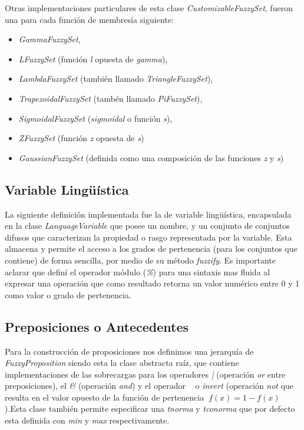 \documentclass[a4paper,10pt,twocolumn]{article}
\begin{document}
 
 Otras implementaciones particulares de esta clase \textit{CustomizableFuzzySet}, fueron una para cada funci\'on de membres\'ia siguiente:
 

 \begin{itemize}
 	\item \textit{GammaFuzzySet}, 
 	\item \textit{LFuzzySet} (funci\'on \textit{l} opuesta de \textit{gamma}), 
 	\item \textit{LambdaFuzzySet} (tambi\'en llamado \textit{TriangleFuzzySet}), 
 	\item \textit{TrapezoidalFuzzySet} (tamb\'en llamado \textit{PiFuzzySet}), 
 	\item \textit{SigmoidalFuzzySet} (\textit{sigmoidal} o funci\'on \textit{s}), 
 	\item \textit{ZFuzzySet} (funci\'on \textit{z} opuesta de \textit{s})
 	\item \textit{GaussianFuzzySet} (definida como una composici\'on de las funciones \textit{z} y \textit{s})
 \end{itemize}

\subsection*{Variable Lingüística}
 La siguiente definici\'on implementada fue la de variable lingüística, encapsulada en la clase \textit{LanguageVariable} que posee un nombre, y un conjunto de conjuntos difusos que caracterizan la propiedad o rasgo representada por la variable. Esta almacena y permite el acceso a los grados de pertenencia (para los conjuntos que contiene) de forma sencilla, por medio de su m\'etodo \textit{fuzzify}. Es importante aclarar que defin\'i el operador m\'odulo (\textit{\%}) para una sintaxis mas fluida al expresar una operaci\'on que como resultado retorna un valor num\'erico entre 0 y 1 como valor o grado de pertenencia.

 \subsection*{Preposiciones o Antecedentes}
 Para la construcci\'on de proposiciones nos definimos una jerarqu\'ia de \textit{FuzzyProposition} siendo esta la clase abstracta ra\'iz, que contiene implementaciones de las sobrecargas para los operadores \textit{|} (operaci\'on \textit{or} entre preposiciones), el \textit{\&} (operaci\'on \textit{and}) y el operador \textit{~} o \textit{invert} (operaci\'on \textit{not} que resulta en el valor opuesto de la funci\'on de pertenencia $~f(x)=1-f(x)$).Esta clase tambi\'en permite especificar una \textit{tnorma} y \textit{tconorma} que por defecto esta definida con \textit{min} y \textit{max} respectivamente.
\end{document}

